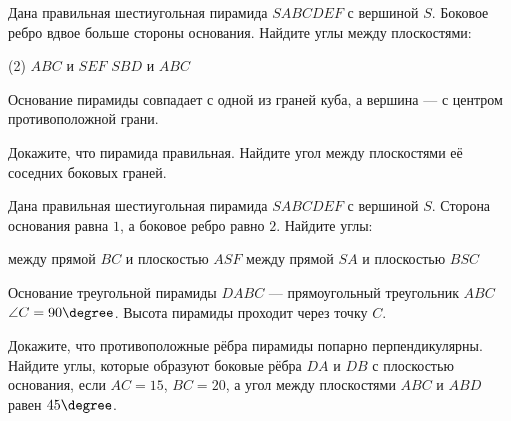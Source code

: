 \begin{class}[number=3]
	\begin{listofex}
		\item Дана правильная шестиугольная пирамида \(SABCDEF\) с вершиной \(S\). Боковое ребро вдвое больше стороны основания. Найдите углы между плоскостями:
		\begin{tasks}(2)
			\task \( ABC \) и \(SEF\)
			\task \( SBD \) и \(ABC\)
		\end{tasks}
		\item Основание пирамиды совпадает с одной из граней куба, а вершина --- с центром противоположной грани.
		\begin{tasks}
			\task Докажите, что пирамида правильная.
			\task Найдите угол между плоскостями её соседних боковых граней.
		\end{tasks}
		\item Дана правильная шестиугольная пирамида \(SABCDEF\) с вершиной \(S\). Сторона основания равна \(1\), а боковое ребро равно \(2\). Найдите углы:
		\begin{tasks}
			\task между прямой \(BC\) и плоскостью \(ASF\)
			\task между прямой \(SA\) и плоскостью \(BSC\)
		\end{tasks}
		\item Основание треугольной пирамиды \(DABC\) --- прямоугольный треугольник \(ABC\) \(\angle C = 90 \degree\). Высота пирамиды проходит через точку \(C\).
		\begin{tasks}
			\task Докажите, что противоположные рёбра пирамиды попарно перпендикулярны.
			\task Найдите углы, которые образуют боковые рёбра \(DA\) и \(DB\) с плоскостью основания, если \(AC =15\), \(BC =20\), а угол между плоскостями \(ABC\) и \(ABD\) равен \(45\degree\).
		\end{tasks}
	\end{listofex}
\end{class}

